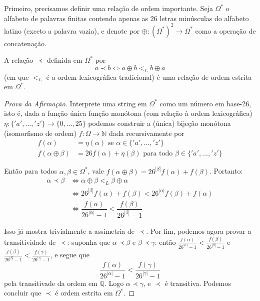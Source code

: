 \documentclass{article}
\begin{document}
\begin{solutionenv}
    Primeiro, precisamos definir uma relação de ordem importante. Seja \(\Omega^*\) o alfabeto de palavras finitas contendo apenas as 26 letras minúsculas do alfabeto latino (exceto a palavra vazia), e denote por \(\oplus: (\Omega^*)^2 \to \Omega^*\) como a operação de concatenação.
    \begin{lemma}
        A relação \(\prec\) definida em \(\Omega^*\) por %
        \[a \prec b \iff a \oplus b <_L b \oplus a\]
        (em que \(<_L\) é a ordem lexicográfica tradicional) é uma relação de ordem estrita em \(\Omega^*\).         
    \end{lemma}
    \begin{proof}[Prova da Afirmação]
        Interprete uma string em \(\Omega^*\) como um número em base-26, isto é, dada a função única função monótona (com relação à ordem lexicográfica) \(\eta:\{'a',\dots, 'z'\} \to \{0, \dotsc, 25\}\) 
        podemos construir a (única) bijeção monótona (isomorfismo de ordem) \(f: \Omega \to \mathbb{N}\) dada recursivamente por 
        \begin{align*}
            f(\alpha) &= \eta(\alpha) \text{ se } \alpha \in \{'a', \dotsc, 'z'\} \\
            f(\alpha \oplus \beta) &= 26f(\alpha) + \eta(\beta) \text{ para todo } \beta \in \{'a',\dotsc, 'z'\}
        \end{align*}

        Então para todos \(\alpha, \beta \in \Omega^*\), vale \(f(\alpha \oplus \beta) = 26^{|\beta|}f(\alpha) + f(\beta)\). Portanto:
        \begin{align*}
            \alpha \prec \beta &\iff \alpha \oplus \beta <_L \beta \oplus \alpha \\
            &\iff 26^{|\beta|}f(\alpha) + f(\beta) < 26^{|\alpha|}f(\beta) +f(\alpha) \\
            &\iff \dfrac{f(\alpha)}{26^{|\alpha|} - 1} < \dfrac{f(\beta)}{26^{|\beta|} - 1} 
        \end{align*}
        
        Isso já mostra trivialmente a assimetria de \(\prec\). Por fim, podemos agora provar a transitividade de \(\prec\): suponha que \(\alpha \prec \beta\) e \(\beta \prec \gamma\): então \(\frac{f(\alpha)}{26^{|\alpha|} - 1} < \frac{f(\beta)}{26^{|\beta|} - 1}\) e \(\frac{f(\beta)}{26^{|\beta|} - 1} < \frac{f(\gamma)}{26^{|\gamma|} - 1}\), e segue que
        \[\frac{f(\alpha)}{26^{|\alpha|} - 1} < \frac{f(\gamma)}{26^{|\gamma|} - 1}\]
        pela transitivade da ordem em \(\mathbb{Q}\). Logo \(\alpha \prec \gamma\), e \(\prec\) é transitiva. Podemos concluir que \(\prec\) é ordem estrita em \(\Omega^*\).  
    \end{proof}


\end{solutionenv}
\end{document}
